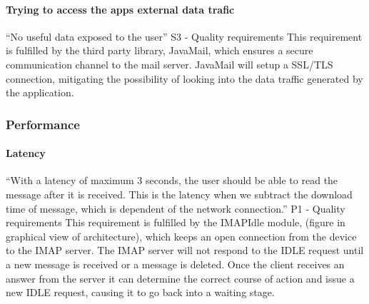 \paragraph{Trying to access the apps external data trafic}\hfill
\newline
“No useful data exposed to the user” S3 - Quality requirements
\newline
\newline
This requirement is fulfilled by the third party library, JavaMail, which ensures a secure communication channel to the mail server. JavaMail  will setup a SSL/TLS connection, mitigating the possibility of looking into the data traffic generated by the application.

\subsubsection{Performance}

\paragraph{Latency}\hfill
\newline
“With a latency of maximum 3 seconds, the user should be able to read the message after it is received. This is the latency when we subtract the download time of message, which is dependent of the network connection.” P1 - Quality requirements
\newline
\newline
This requirement is fulfilled by the IMAPIdle module, (figure in graphical view of architecture), which keeps an open connection from the device to the IMAP server. The IMAP server will not respond to the IDLE request until a new message is received or a message is deleted. Once the client receives an answer from the server it can determine the correct course of action and issue a new IDLE request, causing it to go back into a waiting stage\cite{bib:imapi}. 